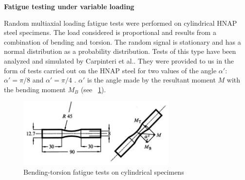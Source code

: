 \documentclass[3p,times,number,review]{elsarticle}
\newcommand{\figref}[1]{\figurename~\ref{#1}}
\begin{document}
\noindent
\textbf{Fatigue testing under variable loading}

Random multiaxial loading fatigue tests were performed on cylindrical HNAP steel specimens\cite{ACHTELIC1994}. The load considered is proportional and results from a combination of bending and torsion. The random signal is stationary and has a normal distribution as a probability distribution. Tests of this type have been analyzed and simulated by Carpinteri et al.\cite{carpinteri2003multiaxial}. They were provided to us in the form of tests carried out on the HNAP steel for two values of the angle $\alpha'$: $\alpha' = \pi / 8$ and $\alpha' = \pi / 4$ . $\alpha' $ is the angle made by the resultant moment $M$ with the bending moment $M_B$ (see \figref{fig.10HNAPsample}).

\begin{figure}[!h]
\centering
\includegraphics[width=0.7\textwidth]{figures//10HNAPsample.png} 
\caption{Bending-torsion fatigue tests on cylindrical specimens\cite{carpinteri2003multiaxial}}
\label{fig.10HNAPsample}
\end{figure}
\end{document}
